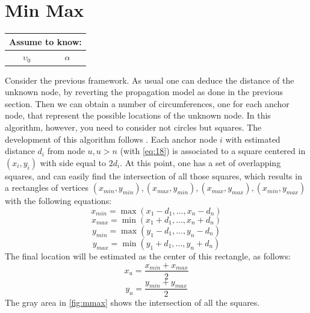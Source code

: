 \documentclass[12pt]{report}
\begin{document}
\section{Min Max}
\begin{center}
    \begin{tabular}{ |c|c| } 
    \hline
    \multicolumn{2}{|c|}{ \textbf{Assume to know:} } \\
    \hline
    $\upsilon_0$ & $\alpha$ \\
    \hline
    \end{tabular}
\end{center}
Consider the previous framework. As usual one can deduce the distance of the unknown node, by reverting the propagation model as done in the previous section. Then we can obtain a number of circumferences, one for each anchor node, that represent the possible locations of the unknown node. In this algorithm, however, you need to consider not circles but squares. The development of this algorithm follows \cite{inproceedings}. Each anchor node $i$ with estimated distance $d_i$ from node $u,u>n$ (with \eqref{eq:18}) is associated to a square centered in $(x_i,y_i)$ with side equal to $2d_i$. At this point, one has a set of overlapping squares, and can easily find the intersection of all those squares,  which results in a rectangles of vertices $(x_{min},y_{min}), (x_{max},y_{min}), (x_{max},y_{max}), (x_{min},y_{max})$ with the following equations:
\begin{equation}
    x_{min}=\max(x_1-d_1,...,x_n-d_n)
\end{equation}
\begin{equation}
    x_{max}=\min(x_1+d_1,...,x_n+d_n)
\end{equation}
\begin{equation}
    y_{min}=\max(y_1-d_1,...,y_n-d_n)
\end{equation}
\begin{equation}
    y_{max}=\min(y_1+d_1,...,y_n+d_n)
\end{equation}
The final location will be estimated as the center of this rectangle, as follows:
\begin{equation}
    x_u=\frac{x_{min}+x_{max}}{2}
\end{equation}
\begin{equation}
    y_u=\frac{y_{min}+y_{max}}{2}
\end{equation}
The gray area in \ref{fig:mmax} shows the intersection of all the squares.
\end{document}
